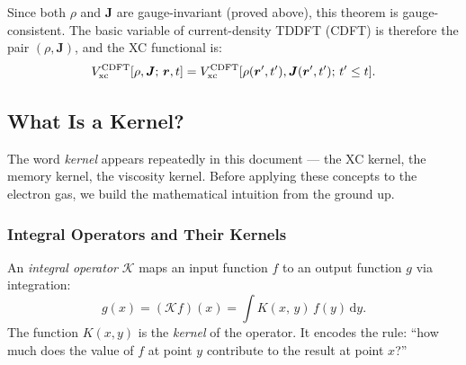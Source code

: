 \documentclass[12pt,letterpaper]{article}
\newcommand{\dd}{\mathrm{d}}
\newcommand{\Vxc}{V_{\mathrm{xc}}}
\theoremstyle{definition}
\begin{document}
Since both $\rho$ and $\bm{J}$ are gauge-invariant (proved above), this
theorem is gauge-consistent.  The basic variable of current-density TDDFT
(CDFT) is therefore the pair $(\rho, \bm{J})$, and the XC functional
is:
\begin{equation}
  \Vxc^{\rm CDFT}[\rho,\bm{J};\,\bm{r},t]
  = \Vxc^{\rm CDFT}[\rho(\bm{r}',t'),\bm{J}(\bm{r}',t');\,t'\leq t].
  \label{eq:vxc_cdft}
\end{equation}

\subsection{What Is a Kernel?}
\label{sec:kernel}

The word \emph{kernel} appears repeatedly in this document --- the XC
kernel, the memory kernel, the viscosity kernel.  Before applying these
concepts to the electron gas, we build the mathematical intuition from
the ground up.

\subsubsection{Integral Operators and Their Kernels}

An \emph{integral operator} $\mathcal{K}$ maps an input function $f$
to an output function $g$ via integration:
\begin{equation}
  g(x) = (\mathcal{K}f)(x)
  = \int K(x,\,y)\,f(y)\,\dd y.
  \label{eq:integral_op}
\end{equation}
The function $K(x,y)$ is the \emph{kernel} of the operator.  It encodes
the rule: ``how much does the value of $f$ at point $y$ contribute to
the result at point $x$?''
\end{document}

